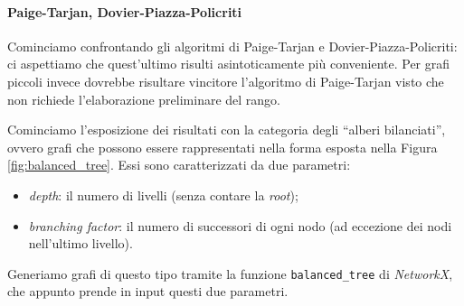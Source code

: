 \paragraph{Paige-Tarjan, Dovier-Piazza-Policriti} Cominciamo confrontando gli algoritmi di Paige-Tarjan e Dovier-Piazza-Policriti: ci aspettiamo che quest'ultimo risulti asintoticamente più conveniente. Per grafi piccoli invece dovrebbe risultare vincitore l'algoritmo di Paige-Tarjan visto che non richiede l'elaborazione preliminare del rango.

Cominciamo l'esposizione dei risultati con la categoria degli ``alberi bilanciati'', ovvero grafi che possono essere rappresentati nella forma esposta nella Figura \ref{fig:balanced_tree}. Essi sono caratterizzati da due parametri:
\begin{itemize}
    \item \emph{depth}: il numero di livelli (senza contare la \emph{root});
    \item \emph{branching factor}: il numero di successori di ogni nodo (ad eccezione dei nodi nell'ultimo livello).
\end{itemize}

Generiamo grafi di questo tipo tramite la funzione \verb|balanced_tree| di \emph{NetworkX}, che appunto prende in input questi due parametri.

